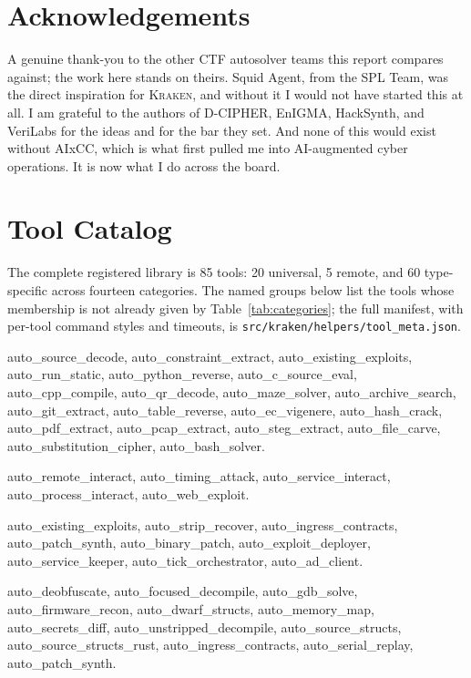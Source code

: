 \documentclass[10pt,twocolumn]{article}
\newcommand{\kraken}{\textsc{Kraken}}
\begin{document}
\section*{Acknowledgements}

A genuine thank-you to the other CTF autosolver teams this report compares against; the work here stands on
theirs. Squid Agent, from the SPL Team, was the direct inspiration for \kraken{}, and without it I would not
have started this at all. I am grateful to the authors of D-CIPHER, EnIGMA, HackSynth, and VeriLabs for the
ideas and for the bar they set. And none of this would exist without AIxCC, which is what first pulled me into
AI-augmented cyber operations. It is now what I do across the board.

\appendix
\section{Tool Catalog}
\label{sec:appendix}

The complete registered library is 85 tools: 20 universal, 5 remote, and 60 type-specific across fourteen
categories. The named groups below list the tools whose membership is not already given by
Table~\ref{tab:categories}; the full manifest, with per-tool command styles and timeouts, is
\texttt{src/kraken/helpers/tool\_meta.json}.

\begin{description}[leftmargin=0pt,labelsep=0.4em,itemsep=3pt,font=\normalfont\bfseries]
\raggedright
\item[Universal (20, in run order)] \ttfamily\small auto\_source\_decode, auto\_constraint\_extract,
auto\_existing\_exploits, auto\_run\_static, auto\_python\_reverse, auto\_c\_source\_eval, auto\_cpp\_compile,
auto\_qr\_decode, auto\_maze\_solver, auto\_archive\_search, auto\_git\_extract, auto\_table\_reverse,
auto\_ec\_vigenere, auto\_hash\_crack, auto\_pdf\_extract, auto\_pcap\_extract, auto\_steg\_extract,
auto\_file\_carve, auto\_substitution\_cipher, auto\_bash\_solver.

\item[Remote (5)] \ttfamily\small auto\_remote\_interact, auto\_timing\_attack, auto\_service\_interact,
auto\_process\_interact, auto\_web\_exploit.

\item[Attack-defense (9)] \ttfamily\small auto\_existing\_exploits, auto\_strip\_recover,
auto\_ingress\_contracts, auto\_patch\_synth, auto\_binary\_patch, auto\_exploit\_deployer,
auto\_service\_keeper, auto\_tick\_orchestrator, auto\_ad\_client.

\item[Firmware (13)] \ttfamily\small auto\_deobfuscate, auto\_focused\_decompile, auto\_gdb\_solve,
auto\_firmware\_recon, auto\_dwarf\_structs, auto\_memory\_map, auto\_secrets\_diff, auto\_unstripped\_decompile,
auto\_source\_structs, auto\_source\_structs\_rust, auto\_ingress\_contracts, auto\_serial\_replay,
auto\_patch\_synth.
\end{description}
\end{document}
